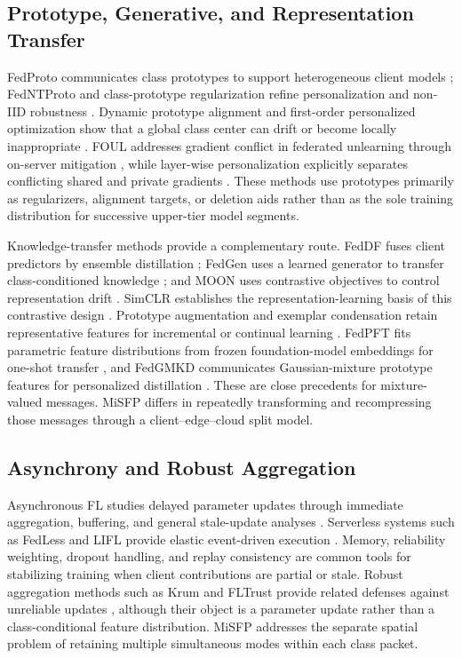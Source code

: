 \subsection{Prototype, Generative, and Representation Transfer}
FedProto communicates class prototypes to support heterogeneous client models \cite{tan2022fedproto}; FedNTProto and class-prototype regularization refine personalization and non-IID robustness \cite{10660707,dai2023tacklingFedProx}. Dynamic prototype alignment and first-order personalized optimization show that a global class center can drift or become locally inappropriate \cite{bensiah2025feddpa,zhang2020personalized}. FOUL addresses gradient conflict in federated unlearning through on-server mitigation \cite{nguyen2026computation}, while layer-wise personalization explicitly separates conflicting shared and private gradients \cite{nguyen2026towards}. These methods use prototypes primarily as regularizers, alignment targets, or deletion aids rather than as the sole training distribution for successive upper-tier model segments.

Knowledge-transfer methods provide a complementary route. FedDF fuses client predictors by ensemble distillation \cite{lin2020ensemble}; FedGen uses a learned generator to transfer class-conditioned knowledge \cite{venkateswaran2023fedgen,zhu2021data}; and MOON uses contrastive objectives to control representation drift \cite{9578660}. SimCLR establishes the representation-learning basis of this contrastive design \cite{chen2020simple}. Prototype augmentation and exemplar condensation retain representative features for incremental or continual learning \cite{9578909,Nguyen_2026_CVPR,rebuffi2017icarl}. FedPFT fits parametric feature distributions from frozen foundation-model embeddings for one-shot transfer \cite{beitollahi2025fedpft}, and FedGMKD communicates Gaussian-mixture prototype features for personalized distillation \cite{zhang2024fedgmkd}. These are close precedents for mixture-valued messages. MiSFP differs in repeatedly transforming and recompressing those messages through a client--edge--cloud split model.

\subsection{Asynchrony and Robust Aggregation}
Asynchronous FL studies delayed parameter updates through immediate aggregation, buffering, and general stale-update analyses \cite{xie2019asynchronous,nguyen2022federated,fraboni2023general}. Serverless systems such as FedLess and LIFL provide elastic event-driven execution \cite{grafberger2021fedless,qi2024lifl}. Memory, reliability weighting, dropout handling, and replay consistency are common tools for stabilizing training when client contributions are partial or stale. Robust aggregation methods such as Krum and FLTrust provide related defenses against unreliable updates \cite{blanchard2017krum,cao2021fltrust}, although their object is a parameter update rather than a class-conditional feature distribution. MiSFP addresses the separate spatial problem of retaining multiple simultaneous modes within each class packet.

